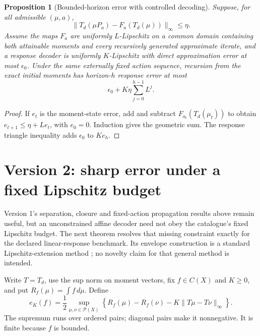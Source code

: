 \documentclass[11pt]{article}
\newtheorem{proposition}{Proposition}
\theoremstyle{definition}
\begin{document}
\begin{proposition}[Bounded-horizon error with controlled decoding]
Suppose, for all admissible $(\mu,a)$,
\[
 \|T_d(\mu P_a)-F_a(T_d(\mu))\|_\infty\leq\eta.
\]
Assume the maps $F_a$ are uniformly $L$-Lipschitz on a common domain containing both attainable moments and every recursively generated approximate iterate, and a response decoder is uniformly $K$-Lipschitz with direct approximation error at most $\epsilon_0$. Under the same externally fixed action sequence, recursion from the exact initial moments has horizon-$h$ response error at most
\[
 \epsilon_0+K\eta\sum_{j=0}^{h-1}L^j.
\]
\end{proposition}
\begin{proof}
If $e_t$ is the moment-state error, add and subtract $F_{a_t}(T_d(\mu_t))$ to obtain $e_{t+1}\leq\eta+Le_t$, with $e_0=0$. Induction gives the geometric sum. The response triangle inequality adds $\epsilon_0$ to $K e_h$.
\end{proof}


\section*{Version 2: sharp error under a fixed Lipschitz budget}
Version 1's separation, closure and fixed-action propagation results above
remain useful, but an unconstrained affine decoder need not obey the
catalogue's fixed Lipschitz budget. The next theorem resolves that missing
constraint exactly for the declared linear-response benchmark. Its envelope
construction is a standard Lipschitz-extension method \cite{mcshane}; no
novelty claim for that general method is intended.

Write $T=T_d$, use the sup norm on moment vectors, fix $f\in C(X)$ and
$K\geq0$, and put $R_f(\mu)=\int f\,d\mu$. Define
\[
 e_K(f)=\frac12\sup_{\mu,\nu\in\mathcal P(X)}
 \left\{R_f(\mu)-R_f(\nu)-K\|T\mu-T\nu\|_\infty\right\}.
\]
The supremum runs over ordered pairs; diagonal pairs make it nonnegative.
It is finite because $f$ is bounded.
\end{document}
